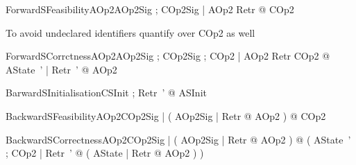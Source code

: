  


\begin{theorem}{ ForwardSFeasibilityAOp2}\forall AOp2Sig ; COp2Sig | \pre AOp2 \land Retr @ \pre COp2
\end{theorem}

 

To avoid undeclared identifiers quantify over COp2 as well
\begin{theorem}{ ForwardSCorrctnessAOp2}\forall AOp2Sig ; COp2Sig ; COp2 | \pre AOp2 \land Retr \land COp2 @ \exists AState~' | Retr~' @ AOp2
\end{theorem}

 

\begin{theorem}{ BarwardSInitialisation}\forall CSInit ; Retr~' @ ASInit
\end{theorem}

 

\begin{theorem}{ BackwardSFeasibilityAOp2}\forall COp2Sig | ( \forall AOp2Sig | Retr @ \pre AOp2 ) @ \pre COp2
\end{theorem}

 

\begin{theorem}{ BackwardSCorrectnessAOp2}\forall COp2Sig | ( \forall AOp2Sig | Retr @ \pre AOp2 ) @ ( \forall AState~' ; COp2 | Retr~' @ ( \exists AState | Retr @ AOp2 ) )
\end{theorem}

 